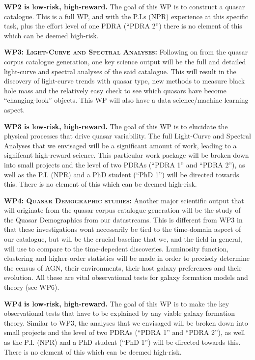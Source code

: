 \documentclass[oneside, a4paper, onecolumn, 11pt]{article}
\begin{document}
\noindent
{\bf WP2 is low-risk, high-reward.}
The goal of this WP is to construct a quasar catalogue.
This is a full WP, and with the P.I.s (NPR) experience at this
specific task, plus the effort level of one PDRA (``PDRA 2'') there is
no element of this which can be deemed high-risk.


\smallskip
\smallskip
\noindent
\textbf{\textsc{WP3: Light-Curve and Spectral Analyses:}} 
Following on from the quasar corpus catalogue generation, one key
science output will be the full and detailed light-curve and spectral
analyses of the said catalogue. This will result in the discovery of
light-curve trends with quasar type, new methods to measure black hole
mass and the relatively easy check to see which quasars have become
``changing-look'' objects. This WP will also have a data science/machine learning 
aspect.

\noindent
{\bf WP3 is low-risk, high-reward.} 
The goal of this WP is to elucidate the physical processes that drive quasar variability.
The full Light-Curve and Spectral
Analyses that we envisaged will be a significant amount of work,
leading to a signifcant high-reward science. This particular work
package will be broken down into small projects and the level of two
PDRAs (``PDRA 1'' and ``PDRA 2''), as well as the P.I. (NPR) and a PhD
student (``PhD 1'') will be directed towards this. There is no element
of this which can be deemed high-risk.


\smallskip
\smallskip
\noindent
\textbf{\textsc{WP4: Quasar Demographic studies:}} 
Another major scientific output that will originate from the quasar
corpus catalogue generation will be the study of the Quasar
Demographics from our datastreams. This is different from WP3 in that
these investigations wont necessarily be tied to the time-domain
aspect of our catalogue, but will be the crucial baseline that we, and
the field in general, will use to compare to the time-depedent
discoveries. Luminosity function, clustering and higher-order
statistics will be made in order to precisely determine the census of
AGN, their environments, their host galaxy preferences and their
evolution. All these are vital observational tests for galaxy
formation models and theory (see WP6).

\noindent
{\bf WP4 is low-risk, high-reward.}
The goal of this WP is to make the key observational tests that have to be explained by any 
viable galaxy formation theory. 
Similar to WP3, the analyses that we envisaged will be broken down
into small projects and the level of two PDRAs (``PDRA 1'' and ``PDRA
2''), as well as the P.I. (NPR) and a PhD student (``PhD 1'') will be
directed towards this. There is no element of this which can be deemed
high-risk.
\end{document}
